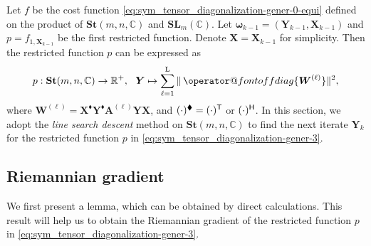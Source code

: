 \documentclass[final,onefignum,onetabnum]{siamart190516}
\makeatletter
\newcommand{\matr}[1]{\boldsymbol{#1}}
\newcommand{\T}{{\sf T}} %
\renewcommand{\H}{{\sf H}} %
\newcommand{\offdiag}[1]{\mathop{\operator@font offdiag}\{#1\}} %
\newcommand{\RR}{\mathbb{R}}
\newcommand{\CC}{\mathbb{C}}
\newcommand{\matrelem}[1]{\mathrm{#1}}
\renewcommand{\H}{{\sf H}}      %
\renewcommand{\TH}{{\blacklozenge}}
\newcommand{\SL}{\mathbf{SL}}
\newcommand{\St}{\mathbf{St}}
\makeatother
\begin{document}
Let $f$ be the cost function \cref{eq:sym_tensor_diagonalization-gener-0-equi} defined on the product of $\St(m,n,\CC)$ and $\SL_{m}(\CC)$.   
Let $\matr{\omega}_{k-1}=(\matr{Y}_{k-1},\matr{X}_{k-1})$ and $p=f_{1,\matr{X}_{k-1}}$ be the first restricted function. 
Denote $\matr{X}=\matr{X}_{k-1}$ for simplicity. 
Then the restricted function $p$ can be expressed as 
\begin{equation}\label{eq:sym_tensor_diagonalization-gener-3}
p: \St(m,n,\CC)\rightarrow\RR^+,\ \ \matr{Y}\mapsto \sum_{\ell=1}^{\matrelem{L}} \|\offdiag{\matr{W}^{(\ell)}}\|^2,
\end{equation}
where 
$\matr{W}^{(\ell)}=\matr{X}^{\TH}\matr{Y}^{\TH}\matr{A}^{(\ell)}\matr{Y} \matr{X}$, and $(\cdot)^{\TH}=(\cdot)^{\T}$ or $(\cdot)^{\H}$. In this section, we adopt the \emph{line search descent} \cite{absil2005convergence,absil2009optimization,nocedal2006numerical,ring2012optimization,sato2015new} method on $\St(m,n,\CC)$ to find the next iterate $\matr{Y}_{k}$ for the restricted function $p$ in \cref{eq:sym_tensor_diagonalization-gener-3}. 

\subsection{Riemannian gradient}
We first present a lemma, which can be obtained by direct calculations.
This result will help us to obtain the Riemannian gradient of the restricted function $p$ in \cref{eq:sym_tensor_diagonalization-gener-3}. 
\end{document}
